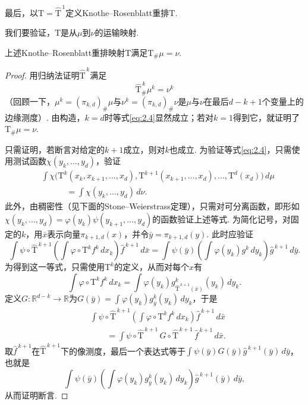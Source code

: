 最后，以$\mathrm T=\widehat{\mathrm T}^{\,1}$定义Knothe--Rosenblatt重排$\mathrm T$.

我们要验证，$\mathrm T$是从$\mu$到$\nu$的运输映射.

\begin{proposition}\label{obj:2.18}
上述Knothe--Rosenblatt重排映射$\mathrm T$满足$\mathrm T_\#\mu=\nu$.
\end{proposition}
\begin{proof}
用归纳法证明$\widehat{\mathrm T}^{\,k}$满足
\begin{equation}\label{eq:2.4}
\widehat{\mathrm T}^{\,k}_\#\mu^k=\nu^k
\end{equation}
（回顾一下，$\mu^k=(\pi_{k,d})_\#\mu$与$\nu^k=(\pi_{k,d})_\#\nu$是$\mu$与$\nu$在最后$d-k+1$个变量上的边缘测度）. 由构造，$k=d$时等式\eqref{eq:2.4}显然成立；若对$k=1$得到它，就证明了$\mathrm T_\#\mu=\nu$.

只需证明，若断言对给定的$k+1$成立，则对$k$也成立. 为验证等式\eqref{eq:2.4}，只需使用测试函数$\chi(y_k,\ldots,y_d)$，验证
\[
\begin{aligned}
&\int\chi\bigl(\mathrm T^k(x_k,x_{k+1},\ldots,x_d),\mathrm T^{k+1}(x_{k+1},\ldots,x_d),\ldots,\mathrm T^d(x_d)\bigr)\,d\mu\\
&\hspace{3em}=\int\chi(y_k,\ldots,y_d)\,d\nu.
\end{aligned}
\]
此外，由稠密性（见下面的Stone--Weierstrass定理），只需对可分离函数，即形如$\chi(y_k,\ldots,y_d)=\varphi(y_k)\psi(y_{k+1},\ldots,y_d)$的函数验证上述等式. 为简化记号，对固定的$k$，用$\bar x$表示向量$\pi_{k+1,d}(x)$，并令$\bar y=\pi_{k+1,d}(y)$. 此时应验证
\[
\int\psi\circ\widehat{\mathrm T}^{\,k+1}
 \left(\int\varphi\circ\mathrm T^k f^k\,dx_k\right)\widehat f^{\,k+1}\,d\bar x
=\int\psi(\bar y)\left(\int\varphi(y_k)g^k\,dy_k\right)\widehat g^{\,k+1}\,d\bar y.
\]
为得到这一等式，只需使用$\mathrm T^k$的定义，从而对每个$x$有
\[
\int\varphi\circ\mathrm T^k f^k\,dx_k
=\int\varphi(y_k)g^k_{\widehat{\mathrm T}^{\,k+1}(\bar x)}(y_k)\,dy_k.
\]
定义$G:\mathbb R^{d-k}\to\mathbb R$为$G(\bar y)=\int\varphi(y_k)g^k_{\bar y}(y_k)\,dy_k$，于是
\[
\begin{aligned}
&\int\psi\circ\widehat{\mathrm T}^{\,k+1}
 \left(\int\varphi\circ\mathrm T^k f^k\,dx_k\right)\widehat f^{\,k+1}\,d\bar x\\
&\hspace{2em}=\int\psi\circ\widehat{\mathrm T}^{\,k+1}\,G\circ\widehat{\mathrm T}^{\,k+1}\,\widehat f^{\,k+1}\,d\bar x.
\end{aligned}
\]
取$\widehat f^{\,k+1}$在$\widehat{\mathrm T}^{\,k+1}$下的像测度，最后一个表达式等于$\int\psi(\bar y)G(\bar y)\widehat g^{\,k+1}(\bar y)\,d\bar y$，也就是
\[
\int\psi(\bar y)\left(\int\varphi(y_k)g^k_{\bar y}(y_k)\,dy_k\right)\widehat g^{\,k+1}(\bar y)\,d\bar y,
\]
从而证明断言.
\end{proof}

